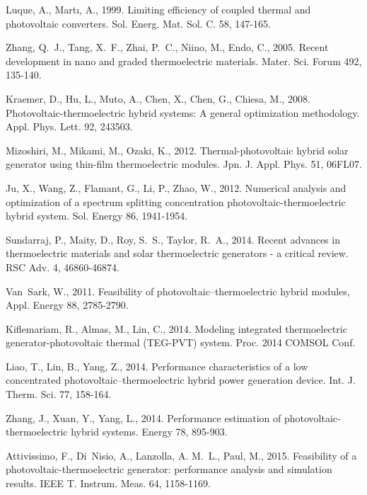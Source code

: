 \documentclass[fleqn,10pt]{SelfArx} %
\begin{document}
\begin{thebibliography}{}
Luque, A., Mart{\i}, A., 1999. Limiting efficiency of coupled thermal and photovoltaic converters. Sol. Energ. Mat. Sol. C. 58, 147-165.

Zhang, Q.~J., Tang, X.~F., Zhai, P.~C., Niino, M., Endo, C., 2005. Recent development in nano and graded thermoelectric materials. Mater. Sci. Forum 492, 135-140.

Kraemer, D., Hu, L., Muto, A., Chen, X., Chen, G., Chiesa, M., 2008. Photovoltaic-thermoelectric hybrid systems: A general optimization methodology. Appl. Phys. Lett. 92, 243503.

Mizoshiri, M., Mikami, M., Ozaki, K., 2012. Thermal-photovoltaic hybrid solar generator using thin-film thermoelectric modules. Jpn. J. Appl. Phys. 51, 06FL07.

Ju, X., Wang, Z., Flamant, G., Li, P., Zhao, W., 2012. Numerical analysis and optimization of a spectrum splitting concentration photovoltaic-thermoelectric hybrid system. Sol. Energy 86, 1941-1954.

Sundarraj, P., Maity, D., Roy, S.~S., Taylor, R.~A., 2014. Recent advances in thermoelectric materials and solar thermoelectric generators - a critical review. RSC Adv. 4, 46860-46874.

Van~Sark, W., 2011. Feasibility of photovoltaic--thermoelectric hybrid modules, Appl. Energy 88, 2785-2790.

Kiflemariam, R., Almas, M., Lin, C., 2014. Modeling integrated thermoelectric generator-photovoltaic thermal (TEG-PVT) system. Proc. 2014 COMSOL Conf.

Liao, T., Lin, B., Yang, Z., 2014. Performance characteristics of a low concentrated photovoltaic--thermoelectric hybrid power generation device. Int. J. Therm. Sci. 77, 158-164.

Zhang, J., Xuan, Y., Yang, L., 2014. Performance estimation of photovoltaic-thermoelectric hybrid systems. Energy 78, 895-903.

Attivissimo, F., Di~Nisio, A., Lanzolla, A. M.~L., Paul, M., 2015. Feasibility of a photovoltaic-thermoelectric generator: performance analysis and simulation results. IEEE T. Instrum. Meas. 64, 1158-1169.


\end{thebibliography}
\end{document}
